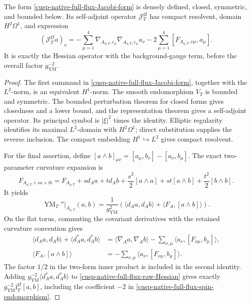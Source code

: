 \begin{proposition}
\label{cusp-native-full-flux-closed-Jacobi}
The form \cref{cusp-native-full-flux-Jacobi-form} is densely defined, closed,
symmetric, and bounded below.  Its self-adjoint operator
\(\mathcal J_T^{\mathrm{gf}}\) has compact resolvent, domain \(H^2\Omega^1\),
and expression
\begin{equation}
 (\mathcal J_T^{\mathrm{gf}}a)_\nu
 =-\sum_{\mu=1}^4
   \nabla_{A_{\eta,T},e_\mu}\nabla_{A_{\eta,T},e_\mu}a_\nu
  -2\sum_{\mu=1}^4[F_{A_{\eta,T},\nu\mu},a_\mu].
 \label{cusp-native-full-flux-Jacobi-expression}
\end{equation}
It is exactly the Hessian operator with the background-gauge term, before
the overall factor \(g_{\mathrm{YM}}^{-2}\).
\end{proposition}

\begin{proof}
The first summand in \cref{cusp-native-full-flux-Jacobi-form}, together with
the \(L^2\)-norm, is an equivalent \(H^1\)-norm.  The smooth endomorphism
\(V_T\) is bounded and symmetric.  The bounded perturbation theorem for
closed forms gives closedness and a lower bound, and the representation
theorem gives a self-adjoint operator.  Its principal symbol is
\(|\xi|^2\) times the identity.  Elliptic regularity identifies its maximal
\(L^2\)-domain with \(H^2\Omega^1\); direct substitution supplies the reverse
inclusion.  The compact embedding \(H^1\hookrightarrow L^2\) gives compact
resolvent.

For the final assertion, define
\([a\wedge b]_{\mu\nu}=[a_\mu,b_\nu]-[a_\nu,b_\mu]\).  The exact
two-parameter curvature expansion is
\[
 F_{A_{\eta,T}+sa+tb}=F_{A_{\eta,T}}+s d_Aa+t d_Ab
 +\frac{s^2}{2}[a\wedge a]+st[a\wedge b]
 +\frac{t^2}{2}[b\wedge b].
\]
It yields
\begin{equation}
 \operatorname{YM}_T''\big|_{A_{\eta,T}}(a,b)
 =\frac1{g_{\mathrm{YM}}^2}
 \left(\langle d_Aa,d_Ab\rangle
 +\langle F_A,[a\wedge b]\rangle\right).
 \label{cusp-native-full-flux-raw-Hessian}
\end{equation}
On the flat torus, commuting the covariant derivatives with the retained
curvature convention gives
\begin{align*}
 \langle d_Aa,d_Ab\rangle+\langle d_A^*a,d_A^*b\rangle
 &=\langle\nabla_Aa,\nabla_Ab\rangle
 -\sum_{\nu,\mu}\langle a_\nu,[F_{\nu\mu},b_\mu]\rangle,\\
 \langle F_A,[a\wedge b]\rangle
 &=-\sum_{\nu,\mu}\langle a_\nu,[F_{\nu\mu},b_\mu]\rangle.
\end{align*}
The factor \(1/2\) in the two-form inner product is included in the second
identity.  Adding
\(g_{\mathrm{YM}}^{-2}\langle d_A^*a,d_A^*b\rangle\) to
\cref{cusp-native-full-flux-raw-Hessian} gives exactly
\(g_{\mathrm{YM}}^{-2}\mathfrak j_T^{\mathrm{gf}}[a,b]\), including the
coefficient \(-2\) in \cref{cusp-native-full-flux-spin-endomorphism}.
\end{proof}

